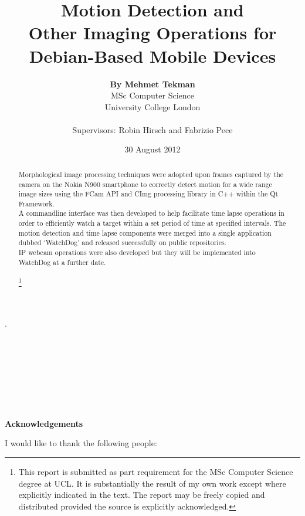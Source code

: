 \documentclass[11pt]{article} %
\title{\Huge Motion Detection and\\Other Imaging Operations for\\Debian-Based Mobile Devices }
\date{30 August 2012}
\author{{\bf By Mehmet Tekman}\\\small MSc Computer Science\\\small University College London\\\\
\large Supervisors: Robin Hirsch and Fabrizio Pece}
\newcommand{\tab}{\hspace*{2em}}
\begin{document}
\maketitle 

\part*{}{\tiny.\\\\\\\\\\\\\\\\}
\begin{abstract}
Morphological image processing techniques were adopted upon frames captured by the camera on the Nokia N900 smartphone to correctly detect motion for a wide range image sizes using the FCam API and CImg processing library in C++ within the Qt Framework.\\\tab A commandline interface was then developed to help facilitate time lapse operations in order to efficiently watch a target within a set period of time at specified intervals. The motion detection and time lapse components were merged into a single application dubbed ‘WatchDog’ and released successfully on public repositories.\\\tab IP webcam operations were also developed but they will be implemented into WatchDog at a further date.
\\\\\let\thefootnote\relax\footnote{This report is submitted as part requirement for the MSc Computer Science degree at UCL. It is substantially the result of my own work except where explicitly indicated in the text. The report may be freely copied and distributed provided the source is explicitly acknowledged.}
\end{abstract}
\pagebreak
\tableofcontents
\begin{center}
\vspace*{\fill}
{\bf Acknowledgements}\\
\end{center}
I would like to thank the following people:
\end{document}
